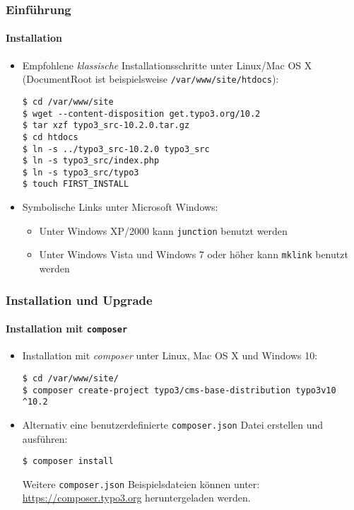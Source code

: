 
\begin{frame}[fragile]
	\frametitle{Einführung}
	\framesubtitle{Installation}

	\begin{itemize}
		\item Empfohlene \textit{klassische} Installationsschritte unter Linux/Mac OS X\newline
			(DocumentRoot ist beispielsweise \texttt{/var/www/site/htdocs}):
\begin{lstlisting}
$ cd /var/www/site
$ wget --content-disposition get.typo3.org/10.2
$ tar xzf typo3_src-10.2.0.tar.gz
$ cd htdocs
$ ln -s ../typo3_src-10.2.0 typo3_src
$ ln -s typo3_src/index.php
$ ln -s typo3_src/typo3
$ touch FIRST_INSTALL
\end{lstlisting}

		\item Symbolische Links unter Microsoft Windows:

			\begin{itemize}
				\item Unter Windows XP/2000 kann \texttt{junction} benutzt werden
				\item Unter Windows Vista und Windows 7 oder höher kann \texttt{mklink} benutzt werden
			\end{itemize}

	\end{itemize}
\end{frame}


\begin{frame}[fragile]
	\frametitle{Installation und Upgrade}
	\framesubtitle{Installation mit \texttt{composer}}

	\begin{itemize}
		\item Installation mit \textit{composer} unter Linux, Mac OS X und Windows 10:
\begin{lstlisting}
$ cd /var/www/site/
$ composer create-project typo3/cms-base-distribution typo3v10 ^10.2
\end{lstlisting}

		\item Alternativ eine benutzerdefinierte \texttt{composer.json} Datei erstellen und ausführen:
\begin{lstlisting}
$ composer install
\end{lstlisting}

			Weitere \texttt{composer.json} Beispielsdateien können unter:\newline
			\smaller
				\href{https://composer.typo3.org}{https://composer.typo3.org} heruntergeladen werden.
			\normalsize

	\end{itemize}
\end{frame}

